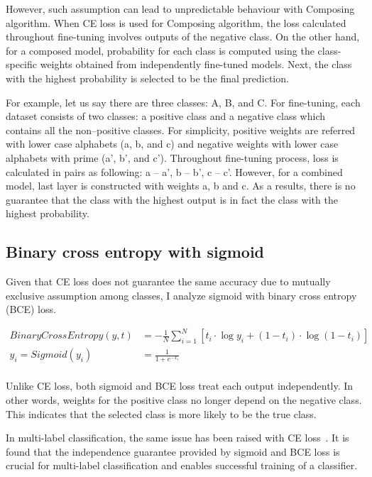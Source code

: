 \documentclass{article}
\begin{document}
However, such assumption can lead to unpredictable behaviour with Composing algorithm. When CE loss is used for Composing algorithm, the loss calculated throughout fine-tuning involves outputs of the negative class. On the other hand, for a composed model, probability for each class is computed using the class-specific weights obtained from independently fine-tuned models. Next, the class with the highest probability is selected to be the final prediction.

For example, let us say there are three classes: A, B, and C. For fine-tuning, each dataset consists of two classes: a positive class and a negative class which contains all the non--positive classes. For simplicity, positive weights are referred with lower case alphabets (a, b, and c) and negative weights with lower case alphabets with prime (a', b', and c'). Throughout fine-tuning process, loss is calculated in pairs as following: a -- a', b -- b', c -- c'. However, for a combined model, last layer is constructed with weights a, b and c. As a results, there is no guarantee that the class with the highest output is in fact the class with the highest probability.

\subsection{Binary cross entropy with sigmoid}

Given that CE loss does not guarantee the same accuracy due to mutually exclusive assumption among classes, I analyze sigmoid with binary cross entropy (BCE) loss.

\begin{align*}
BinaryCrossEntropy(y, t) & = -\frac{1}{N}\sum_{i=1}^N \left[ t_i \cdot \log y_i + (1 - t_i) \cdot \log (1 - t_i) \right] \\
y_i = Sigmoid(y_i) &= \frac{1}{1 + e^{-x_i}} \\
\end{align*}

Unlike CE loss, both sigmoid and BCE loss treat each output independently. In other words, weights for the positive class no longer depend on the negative class. This indicates that the selected class is more likely to be the true class.

In multi-label classification, the same issue has been raised with CE loss~\cite{liu2017deep}. It is found that the independence guarantee provided by sigmoid and BCE loss is crucial for multi-label classification and enables successful training of a classifier.
\end{document}
